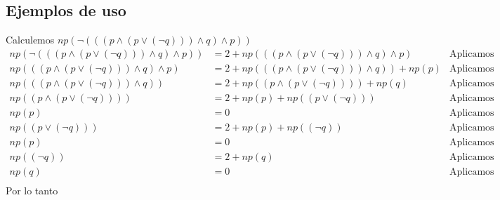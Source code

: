 \documentclass[a4paper]{article}
\begin{document}
\subsection{Ejemplos de uso}
\noindent
Calculemos \(np\left(\neg\left(\left(\left(p \land \left(p \lor \left(\neg q\right)\right)\right) \land q \right) \land p\right)\right)\)
\begin{align*}
    np\left(\neg\left(\left(\left(p \land \left(p \lor \left(\neg q\right)\right)\right) \land q \right) \land p\right)\right) &= 2 + np\left(\left(\left(p \land \left(p \lor \left(\neg q\right)\right)\right) \land q \right) \land p\right)  &\text{Aplicamos el segundo caso.} \\
    np\left(\left(\left(p \land \left(p \lor \left(\neg q\right)\right)\right) \land q \right) \land p\right) &= 2 + np\left(\left(\left(p \land \left(p \lor \left(\neg q\right)\right)\right) \land q \right)\right) + np\left(p\right)  &\text{Aplicamos el quinto caso.} \\
    np\left(\left(\left(p \land \left(p \lor \left(\neg q\right)\right)\right) \land q \right)\right) &= 2 + np\left(\left(p \land \left(p \lor \left(\neg q\right)\right)\right) \right) +  np\left(q\right)  &\text{Aplicamos el tercer caso.} \\
    np\left(\left(p \land \left(p \lor \left(\neg q\right)\right)\right) \right) &= 2 + np\left(p\right) + np\left(\left(p \lor \left(\neg q\right)\right)\right)  &\text{Aplicamos el tercer caso.} \\
    np\left(p\right) &= 0  &\text{Aplicamos el primer caso.} \\
    np\left(\left(p \lor \left(\neg q\right)\right)\right) &= 2 + np\left(p\right) + np\left(\left(\neg q\right)\right)  &\text{Aplicamos el tercer caso.} \\
    np\left(p\right) &= 0  &\text{Aplicamos el primer caso.} \\
    np\left(\left(\neg q\right)\right) &= 2 + np\left(q\right) & \text{Aplicamos el segundo caso.} \\
    np\left(q\right) &= 0 & \text{Aplicamos el primer caso.} \\
\end{align*}
Por lo tanto
\end{document}
